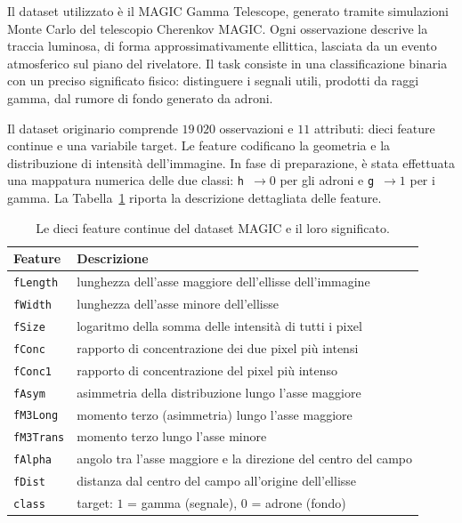 \documentclass[12pt,a4paper]{article}
\begin{document}
Il dataset utilizzato è il MAGIC Gamma Telescope, generato tramite simulazioni 
Monte Carlo del telescopio Cherenkov MAGIC. Ogni osservazione descrive la 
traccia luminosa, di forma approssimativamente ellittica, lasciata da un 
evento atmosferico sul piano del rivelatore. Il task consiste in una 
classificazione binaria con un preciso significato fisico: distinguere i 
segnali utili, prodotti da raggi gamma, dal rumore di fondo generato da adroni. 

Il dataset originario comprende $19\,020$ osservazioni e $11$ attributi: dieci 
feature continue e una variabile target. Le feature codificano la geometria e 
la distribuzione di intensità dell'immagine. In fase 
di preparazione, è stata effettuata una mappatura numerica delle due classi: 
\texttt{h}~$\rightarrow 0$ per gli adroni e \texttt{g}~$\rightarrow 1$ 
per i gamma. La Tabella~\ref{tab:feature} riporta la descrizione 
dettagliata delle feature.

\begin{table}[H]\centering\small
\caption{Le dieci feature continue del dataset MAGIC e il loro significato.}\label{tab:feature}
\begin{tabular}{ll}
\toprule
\textbf{Feature} & \textbf{Descrizione} \\
\midrule
\texttt{fLength}   & lunghezza dell'asse maggiore dell'ellisse dell'immagine \\
\texttt{fWidth}    & lunghezza dell'asse minore dell'ellisse \\
\texttt{fSize}     & logaritmo della somma delle intensità di tutti i pixel \\
\texttt{fConc}     & rapporto di concentrazione dei due pixel più intensi \\
\texttt{fConc1}    & rapporto di concentrazione del pixel più intenso \\
\texttt{fAsym}     & asimmetria della distribuzione lungo l'asse maggiore \\
\texttt{fM3Long}   & momento terzo (asimmetria) lungo l'asse maggiore \\
\texttt{fM3Trans}  & momento terzo lungo l'asse minore \\
\texttt{fAlpha}    & angolo tra l'asse maggiore e la direzione del centro del campo \\
\texttt{fDist}     & distanza dal centro del campo all'origine dell'ellisse \\
\midrule
\texttt{class}     & target: $1$ = gamma (segnale), $0$ = adrone (fondo) \\
\bottomrule
\end{tabular}
\end{table}
\end{document}
